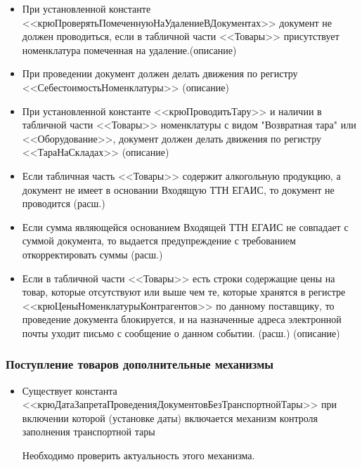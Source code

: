 \begin{itemize}
	\item При установленной константе <<крюПроверятьПомеченнуюНаУдалениеВДокументах>>
	документ не должен проводиться, если в табличной части <<Товары>> присутствует 
	номенклатура помеченная на удаление.(описание)
	\item При проведении документ должен делать движения по регистру <<СебестоимостьНоменклатуры>> (описание)
	\item При установленной константе <<крюПроводитьТару>> и наличии в табличной части <<Товары>> номенклатуры
	с видом "Возвратная тара" или <<Оборудование>>, документ должен делать движения по регистру <<ТараНаСкладах>> (описание)
	\item Если табличная часть <<Товары>> содержит алкогольную продукцию, а документ не имеет в основании Входящую ТТН ЕГАИС, то документ не проводится (расш.)
	\item Если сумма являющейся основанием Входящей ТТН ЕГАИС не совпадает с суммой документа, то выдается предупреждение с требованием откорректировать суммы (расш.)
	\item Если в табличной части <<Товары>> есть строки содержащие цены на товар, которые отсутствуют или выше чем те, которые хранятся в регистре <<крюЦеныНоменклатурыКонтрагентов>> по данному поставщику, то проведение документа блокируется, и на назначенные адреса электронной почты уходит письмо с сообщение о данном событии. (расш.)
	(описание)
\end{itemize}
\vspace{\baselineskip}\par
\subsubsection{Поступление товаров дополнительные механизмы}
\begin{itemize}
	\item Существует константа <<крюДатаЗапретаПроведенияДокументовБезТранспортнойТары>> при 
	включении которой (установке даты) включается механизм контроля заполнения транспортной тары
	\begin{myquote}
     Необходимо проверить актуальность этого механизма.
	\end{myquote}
	
	
\end{itemize}	



